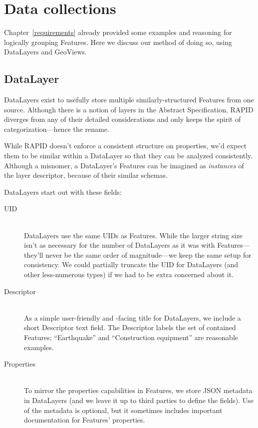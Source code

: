 \section{Data collections}
Chapter~\ref{requirements} already provided some examples and reasoning for logically grouping Features. Here we discuss our method of doing so, using DataLayers and GeoViews.

\subsection{DataLayer}
DataLayers exist to usefully store multiple similarly-structured Features from one source. Although there is a notion of layers in the Abstract Specification, RAPID diverges from any of their detailed considerations and only keeps the spirit of categorization---hence the rename.

While RAPID doesn't enforce a consistent structure on properties, we'd expect them to be similar within a DataLayer so that they can be analyzed consistently. Although a misnomer, a DataLayer's Features can be imagined as \textit{instances} of the layer descriptor, because of their similar schemas.

DataLayers start out with these fields:

\begin{description}

\item[UID] \hfill \\
DataLayers use the same UIDs as Features. While the larger string size isn't as necessary for the number of DataLayers as it was with Features---they'll never be the same order of magnitude---we keep the same setup for consistency. We could partially truncate the UID for DataLayers (and other less-numerous types) if we had to be extra concerned about it.

\item[Descriptor] \hfill \\
As a simple user-friendly and -facing title for DataLayers, we include a short Descriptor text field. The Descriptor labels the set of contained Features; ``Earthquake'' and ``Construction equipment'' are reasonable examples.

\item[Properties] \hfill \\
To mirror the properties capabilities in Features, we store JSON metadata in DataLayers (and we leave it up to third parties to define the fields). Use of the metadata is optional, but it sometimes includes important documentation for Features' properties.
  
\end{description}

